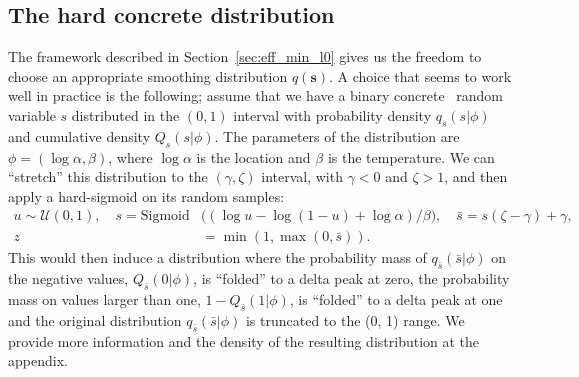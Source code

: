 \documentclass{article} %
\def\*#1{\mathbf{#1}}
\begin{document}
\subsection{The hard concrete distribution}
The framework described in Section~\ref{sec:eff_min_l0} gives us the freedom to choose an appropriate smoothing distribution $q(\*s)$. A choice that seems to work well in practice is the following; assume that we have a binary concrete~\citep{maddison2016concrete,jang2016categorical} random variable $s$ distributed in the $(0, 1)$ interval 
with probability density $q_s(s|\phi)$ and cumulative density $Q_s(s|\phi)$. The parameters of the distribution are $\phi = (\log\alpha, \beta)$, where $\log\alpha$ is the location and $\beta$ is the temperature. We can ``stretch'' this distribution to the $(\gamma, \zeta)$ interval, with $\gamma < 0$ and $\zeta > 1$, and then apply a hard-sigmoid on its random samples:
\begin{align}
    u \sim \mathcal{U}(0, 1), \quad s = \text{Sigmoid}& \big((\log u - \log (1 - u) + \log \alpha) / \beta\big), \quad \bar{s} = s(\zeta - \gamma) + \gamma,\\
 z & = \min(1, \max(0, \bar{s})). 
\end{align}
This would then induce a distribution where the probability mass of $q_{\bar{s}}(\bar{s}|\phi)$ on the negative values, $Q_{\bar{s}}(0|\phi)$, is ``folded'' to a delta peak at zero, the probability mass on values larger than one, $1 - Q_{\bar{s}}(1|\phi)$, is ``folded'' to a delta peak at one and the original distribution $q_{\bar{s}}(\bar{s}|\phi)$ is truncated to the (0, 1) range. We provide more information and the density of the resulting distribution at the appendix.
\end{document}
